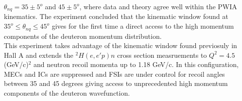 $\theta_{nq}=35\pm5^{o}$ and $45\pm5^{o}$, where data and theory agree well within the PWIA kinematics. The experiment concluded that the kinematic window found
at $35^{o}\leq \theta_{nq}\leq45^{o}$ gives for the first time a direct access to the high momentum components of the deuteron momentum distribution. \\
\indent This experiment takes advantage of the kinematic window found previosuly in Hall A and extends the $^{2}H(e,e'p)n$ cross section measruements to $Q^{2}=4.5$ (GeV/c)$^{2}$
and neutron recoil momenta up to 1.18 GeV/c. In this configuration, MECs and ICs are suppressed and FSIs are under control for recoil angles between 35 and 45 degrees
giving access to unprecedented high momentum components of the deuteron wavefunction. \\
